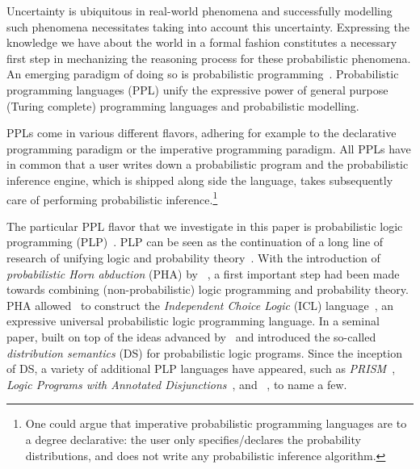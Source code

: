 Uncertainty is ubiquitous in real-world phenomena and successfully modelling such phenomena necessitates taking into account this uncertainty.
Expressing the knowledge we have about the world in a formal fashion constitutes a necessary first step in mechanizing the reasoning process for these probabilistic phenomena.
An emerging paradigm of doing so is probabilistic programming~\citep{meent2018introduction}.
Probabilistic programming languages (PPL) unify the expressive power of general purpose (Turing complete) programming languages and probabilistic modelling.

PPLs come in various different flavors, adhering for example to the declarative programming paradigm or the imperative programming paradigm.
All PPLs have in common that a user writes down a probabilistic program and the probabilistic inference engine, which is shipped along side the language, takes subsequently care of performing probabilistic inference.\footnote{One could argue that imperative probabilistic programming languages are to a degree declarative: the user only specifies/declares the probability distributions, and does not write any probabilistic inference algorithm.}

The particular PPL flavor that we investigate in this paper is probabilistic logic programming (PLP)~\citep{de2015probabilistic,riguzzi2018foundations}.
PLP can be seen as the continuation of a long line of research of unifying logic and probability theory~\citep{russell2015unifying}. With the introduction of {\em probabilistic Horn abduction} (PHA) by ~\citet{poole1993probabilistic}, a first important step had been made towards combining (non-probabilistic) logic programming and probability theory. PHA allowed~\citeauthor{poole1993probabilistic} to  construct the {\em Independent Choice Logic} (ICL) language~\citep{poole1997independent}, an expressive universal probabilistic logic programming language.
In a seminal paper, \citet{sato1995statistical} built on top of the ideas advanced by~\citet{poole1993probabilistic} and introduced the so-called {\em distribution semantics} (DS) for probabilistic logic programs.  
Since the inception of DS, a variety of  additional PLP languages have appeared, such as {\em PRISM}~\citep{sato1997prism}, {\em Logic Programs with Annotated Disjunctions}~\citep{vennekens2004logic}, and {\em \problogsty}~\citep{de2007problog,fierens2015inference}, to name a few.

